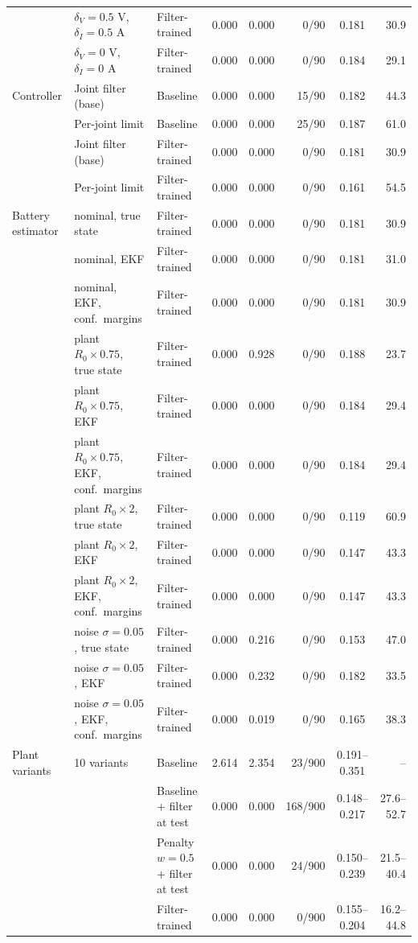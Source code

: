 {\begin{tabular}{lllrrrcr}
 & $\delta_V=0.5$ V, $\delta_I=0.5$ A & Filter-trained & 0.000 & 0.000 & 0/90 & 0.181 & 30.9 \\
 & $\delta_V=0$ V, $\delta_I=0$ A & Filter-trained & 0.000 & 0.000 & 0/90 & 0.184 & 29.1 \\
\midrule
Controller & Joint filter (base) & Baseline & 0.000 & 0.000 & 15/90 & 0.182 & 44.3 \\
 & Per-joint limit & Baseline & 0.000 & 0.000 & 25/90 & 0.187 & 61.0 \\
 & Joint filter (base) & Filter-trained & 0.000 & 0.000 & 0/90 & 0.181 & 30.9 \\
 & Per-joint limit & Filter-trained & 0.000 & 0.000 & 0/90 & 0.161 & 54.5 \\
\midrule
Battery estimator & nominal, true state & Filter-trained & 0.000 & 0.000 & 0/90 & 0.181 & 30.9 \\
 & nominal, EKF & Filter-trained & 0.000 & 0.000 & 0/90 & 0.181 & 31.0 \\
 & nominal, EKF, conf.\ margins & Filter-trained & 0.000 & 0.000 & 0/90 & 0.181 & 30.9 \\
 & plant $R_0\times0.75$, true state & Filter-trained & 0.000 & 0.928 & 0/90 & 0.188 & 23.7 \\
 & plant $R_0\times0.75$, EKF & Filter-trained & 0.000 & 0.000 & 0/90 & 0.184 & 29.4 \\
 & plant $R_0\times0.75$, EKF, conf.\ margins & Filter-trained & 0.000 & 0.000 & 0/90 & 0.184 & 29.4 \\
 & plant $R_0\times2$, true state & Filter-trained & 0.000 & 0.000 & 0/90 & 0.119 & 60.9 \\
 & plant $R_0\times2$, EKF & Filter-trained & 0.000 & 0.000 & 0/90 & 0.147 & 43.3 \\
 & plant $R_0\times2$, EKF, conf.\ margins & Filter-trained & 0.000 & 0.000 & 0/90 & 0.147 & 43.3 \\
 & noise $\sigma=0.05$, true state & Filter-trained & 0.000 & 0.216 & 0/90 & 0.153 & 47.0 \\
 & noise $\sigma=0.05$, EKF & Filter-trained & 0.000 & 0.232 & 0/90 & 0.182 & 33.5 \\
 & noise $\sigma=0.05$, EKF, conf.\ margins & Filter-trained & 0.000 & 0.019 & 0/90 & 0.165 & 38.3 \\
\midrule
Plant variants & 10 variants & Baseline & 2.614 & 2.354 & 23/900 & 0.191--0.351 & -- \\
 &  & Baseline + filter at test & 0.000 & 0.000 & 168/900 & 0.148--0.217 & 27.6--52.7 \\
 &  & Penalty $w=0.5$ + filter at test & 0.000 & 0.000 & 24/900 & 0.150--0.239 & 21.5--40.4 \\
 &  & Filter-trained & 0.000 & 0.000 & 0/900 & 0.155--0.204 & 16.2--44.8 \\
\bottomrule\end{tabular}}
